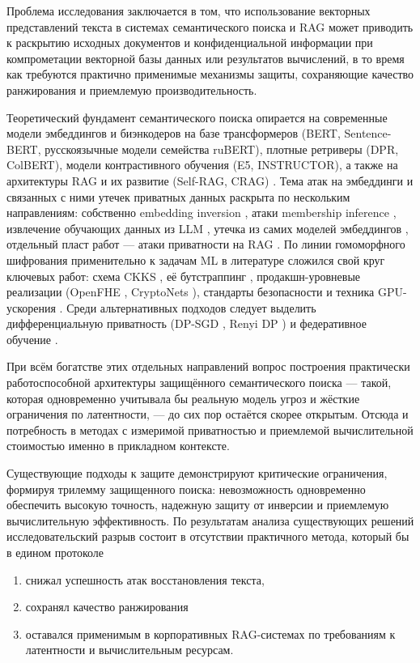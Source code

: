\documentclass[a4paper, 12pt, oneside, openany]{article}
\begin{document}
Проблема исследования заключается в том, что использование векторных представлений текста в системах семантического поиска и RAG может приводить к раскрытию исходных документов и конфиденциальной информации при компрометации векторной базы данных или результатов вычислений, в то время как требуются практично применимые механизмы защиты, сохраняющие качество ранжирования и приемлемую производительность.

Теоретический фундамент семантического поиска опирается на современные модели эмбеддингов и биэнкодеров на базе трансформеров (BERT, Sentence-BERT, русскоязычные модели семейства ruBERT), плотные ретриверы (DPR, ColBERT), модели контрастивного обучения (E5, INSTRUCTOR), а также на архитектуры RAG и их развитие (Self-RAG, CRAG) \cite{ref2,ref3,ref4,ref10,ref28,ref29,ref30,ref34,ref36,ref37,ref38,ref39}. Тема атак на эмбеддинги и связанных с ними утечек приватных данных раскрыта по нескольким направлениям: собственно embedding inversion \cite{ref5,ref6,ref7,ref8}, атаки membership inference \cite{ref40}, извлечение обучающих данных из LLM \cite{ref41}, утечка из самих моделей эмбеддингов \cite{ref42}, отдельный пласт работ — атаки приватности на RAG \cite{ref45}. По линии гомоморфного шифрования применительно к задачам ML в литературе сложился свой круг ключевых работ: схема CKKS \cite{ref12}, её бутстраппинг \cite{ref48}, продакшн-уровневые реализации (OpenFHE \cite{ref47}, CryptoNets \cite{ref50}), стандарты безопасности \cite{ref13} и техника GPU-ускорения \cite{ref49}. Среди альтернативных подходов следует выделить дифференциальную приватность (DP-SGD \cite{ref52}, Renyi DP \cite{ref53}) и федеративное обучение \cite{ref54}.

При всём богатстве этих отдельных направлений вопрос построения практически работоспособной архитектуры защищённого семантического поиска — такой, которая одновременно учитывала бы реальную модель угроз и жёсткие ограничения по латентности, — до сих пор остаётся скорее открытым. Отсюда и потребность в методах с измеримой приватностью и приемлемой вычислительной стоимостью именно в прикладном контексте.

Существующие подходы к защите демонстрируют критические ограничения, формируя трилемму защищенного поиска: невозможность одновременно обеспечить высокую точность, надежную защиту от инверсии и приемлемую вычислительную эффективность. По результатам анализа существующих решений исследовательский разрыв состоит в отсутствии практичного метода, который бы в едином протоколе

\begin{enumerate}
	\def\labelenumi{\arabic{enumi}.}
	\item
	снижал успешность атак восстановления текста,
	\item
	сохранял качество ранжирования
	\item
	оставался применимым в корпоративных RAG-системах по требованиям к латентности и вычислительным ресурсам.
\end{enumerate}
\end{document}

